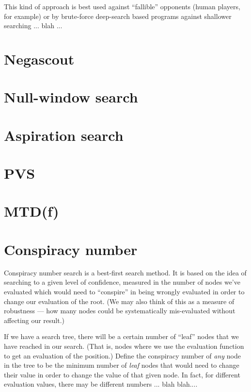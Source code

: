 \documentclass[10pt,dvipdfmx,letterpaper]{report}
\begin{document}
This kind of approach is best used against ``fallible'' opponents (human players, for example)
or by brute-force deep-search based programs against shallower searching ... blah ...

\section{Negascout}
\section{Null-window search}
\section{Aspiration search}
\section{PVS}
\section{MTD(f)}

\section{Conspiracy number}
Conspiracy number search is a best-first search method.
It is based on the idea of searching to a given level of confidence, measured
in the number of nodes we've evaluated which would need to ``conspire'' in being
wrongly evaluated in order to change our evaluation of the root.  (We may also think
of this as a measure of robustness --- how many nodes could be systematically mis-evaluated
without affecting our result.)

If we have a search tree, there will be a certain
number of ``leaf'' nodes that we have reached in our search.  (That is,
nodes where we use the evaluation function to get an evaluation of the position.)
Define the conspiracy number of {\em any} node in the tree to be the minimum number
of {\em leaf} nodes that would need to change their value in order to
change the value of that given node.  In fact, for different evaluation values, there
may be different numbers ... blah blah....
\end{document}
